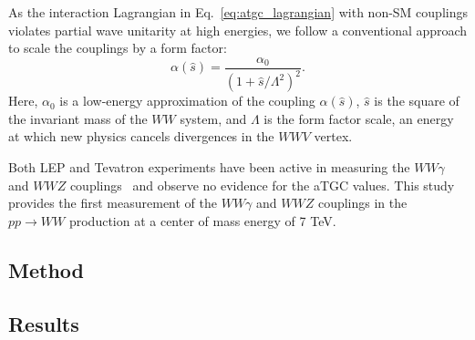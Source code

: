 As the interaction Lagrangian in Eq.~\ref{eq:atgc_lagrangian}
with non-SM couplings violates partial wave unitarity at high energies,
we follow a conventional approach to scale the couplings by a form factor:
\begin{equation}
\label{eq:atgc_formfactor}
\alpha(\hat{s}) = \frac{\alpha_0}{(1 + \hat{s}/\Lambda^2)^2}.
\end{equation}
Here, $\alpha_0$ is a low-energy approximation of the coupling
$\alpha(\hat{s})$, $\hat{s}$ is the square of the invariant mass
of the $WW$ system, and $\Lambda$ is the form factor scale,
an energy at which new physics cancels divergences in the $WWV$
vertex.

Both LEP and Tevatron experiments have been active in measuring
the $WW\gamma$ and $WWZ$ couplings~\cite{atgc_lepResults1,
atgc_lepResults2, atgc_lepResults3,atgc_tevatronResults1,
atgc_tevatronResults2,atgc_tevatronResults3,atgc_tevatronResults4,
atgc_tevatronResults5} and observe no evidence for the aTGC values.
This study provides the first measurement of the $WW\gamma$ and $WWZ$
couplings in the $pp \to WW$ production at a center of mass energy
of 7 TeV.

\subsection{Method}

\subsection{Results}


